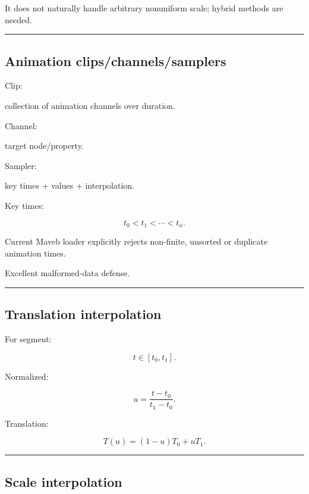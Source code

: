 It does not naturally handle arbitrary nonuniform scale; hybrid methods are needed.

\begin{center}\rule{0.5\linewidth}{0.5pt}\end{center}

\subsection{Animation clips/channels/samplers}\label{04-visual-computing-ii-ch041-animation-clipschannelssamplers}

Clip:

collection of animation channels over duration.

Channel:

target node/property.

Sampler:

key times + values + interpolation.

Key times:

\[
t_0<t_1<\cdots<t_n.
\]

Current Maveb loader explicitly rejects non-finite, unsorted or duplicate animation times.

Excellent malformed-data defense.

\begin{center}\rule{0.5\linewidth}{0.5pt}\end{center}

\subsection{Translation interpolation}\label{04-visual-computing-ii-ch041-translation-interpolation}

For segment:

\[
t\in[t_0,t_1].
\]

Normalized:

\[
u=
\frac{t-t_0}{t_1-t_0}.
\]

Translation:

\[
\boxed{
T(u)
=
(1-u)T_0+uT_1.
}
\]

\begin{center}\rule{0.5\linewidth}{0.5pt}\end{center}

\subsection{Scale interpolation}\label{04-visual-computing-ii-ch041-scale-interpolation}

